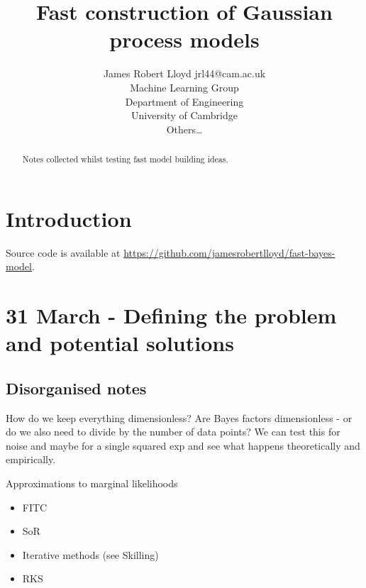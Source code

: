 \documentclass[twoside,11pt]{article}
\begin{document}
\lstset{language=Lisp,basicstyle=\ttfamily\footnotesize} 

\title{Fast construction of Gaussian process models}

\author{\name James Robert Lloyd \email jrl44@cam.ac.uk \\
       \addr 
       Machine Learning Group \\
       Department of Engineering\\
       University of Cambridge\\
       \AND
       \name Others\dots}


\maketitle

\begin{abstract}
Notes collected whilst testing fast model building ideas.
\end{abstract}


\section{Introduction}

Source code is available at \url{https://github.com/jamesrobertlloyd/fast-bayes-model}.

\section{31 March - Defining the problem and potential solutions}

\subsection{Disorganised notes}

How do we keep everything dimensionless?
Are Bayes factors dimensionless - or do we also need to divide by the number of data points?
We can test this for \iid noise and maybe for a single squared exp and see what happens theoretically and empirically.

Approximations to marginal likelihoods
\begin{itemize}
  \item FITC
  \item SoR
  \item Iterative methods (see \eg Skilling)
  \item RKS
\end{itemize}
\end{document}

